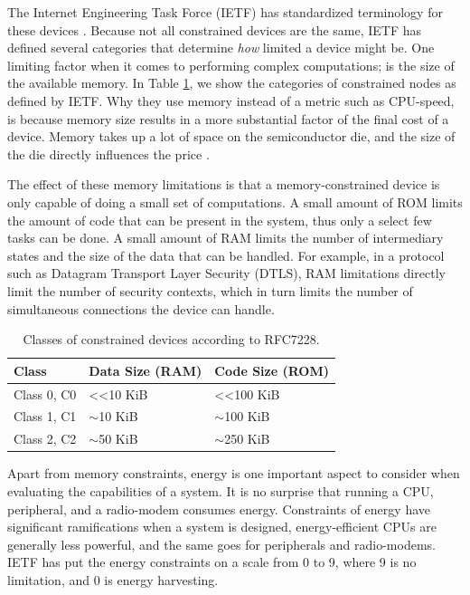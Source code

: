 The Internet Engineering Task Force (IETF) has standardized terminology for these devices \cite{rfc7228}. Because not all constrained devices are the same, IETF has defined several categories that determine \emph{how} limited a device might be. One limiting factor when it comes to performing complex computations; is the size of the available memory. In Table \ref{tab:constrained-classes}, we show the categories of constrained nodes as defined by IETF. Why they use memory instead of a metric such as CPU-speed, is because memory size results in a more substantial factor of the final cost of a device. Memory takes up a lot of space on the semiconductor die, and the size of the die directly influences the price \cite{koopman2015}.


The effect of these memory limitations is that a memory-constrained device is only capable of doing a small set of computations. A small amount of ROM limits the amount of code that can be present in the system, thus only a select few tasks can be done. A small amount of RAM limits the number of intermediary states and the size of the data that can be handled. For example, in a protocol such as Datagram Transport Layer Security (DTLS), RAM limitations directly limit the number of security contexts, which in turn limits the number of simultaneous connections the device can handle.

\begin{table}[h]
\centering
\caption{Classes of constrained devices according to RFC7228.}
\label{tab:constrained-classes}
\begin{tabular}{lll}
\hline\hline
\textbf{Class}  & \textbf{Data Size (RAM)}  & \textbf{Code Size (ROM)}    \\ \hline
Class 0, C0 & \textless{}\textless 10 KiB & \textless{}\textless  100 KiB \\ 
Class 1, C1 & $\sim$10 KiB                & $\sim$100 KiB                 \\ 
Class 2, C2 & $\sim$50 KiB                & $\sim$250 KiB                 \\ \hline\hline
\end{tabular}
\end{table}


Apart from memory constraints, energy is one important aspect to consider when evaluating the capabilities of a system. It is no surprise that running a CPU, peripheral, and a radio-modem consumes energy. Constraints of energy have significant ramifications when a system is designed, energy-efficient CPUs are generally less powerful, and the same goes for peripherals and radio-modems. IETF has put the energy constraints on a scale from 0 to 9, where 9 is no limitation, and 0 is energy harvesting. 

